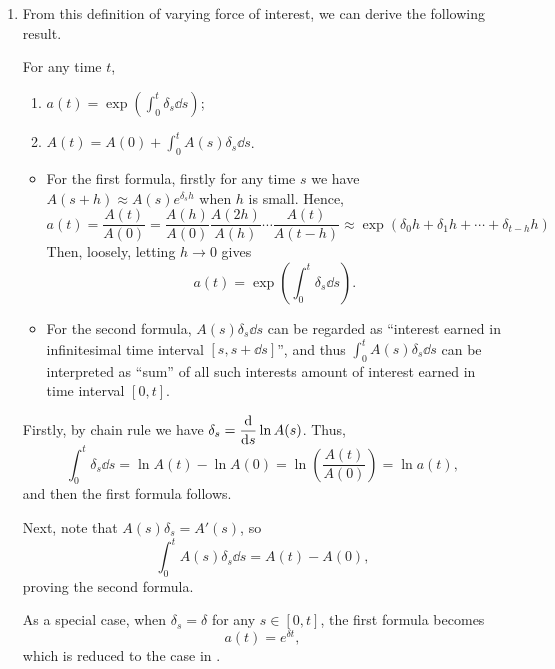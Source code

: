 \begin{enumerate}
\item From this definition of varying force of interest, we can derive the
following result.
\begin{proposition}
\label{prp:foi-fmlas}
For any time \(t\),
\begin{enumerate}
\item \(\displaystyle a(t)=\exp(\int_{0}^{t}\delta_s\dd{s})\);
\item \(\displaystyle A(t)=A(0)+\int_{0}^{t}A(s)\delta_s\dd{s}\).
\end{enumerate}
\end{proposition}
\begin{intuition}
\begin{itemize}
\item For the first formula, firstly for any time \(s\) we have \(A(s+h)\approx
A(s)e^{\delta_sh}\) when \(h\) is small. Hence,
\[
a(t)=\frac{A(t)}{A(0)}=\frac{A(h)}{A(0)}\frac{A(2h)}{A(h)}\dotsb\frac{A(t)}{A(t-h)}
\approx\exp(\delta_0h+\delta_1h+\dotsb+\delta_{t-h}h)
\]
Then, loosely, letting \(h\to 0\) gives
\[
a(t)=\exp(\int_{0}^{t}\delta_s\dd{s}).
\]
\item For the second formula, \(A(s)\delta_s\dd{s}\) can be regarded as
``interest earned in infinitesimal time interval \([s,s+\dd{s}]\)'', and thus
\(\displaystyle \int_{0}^{t}A(s)\delta_s\dd{s}\) can be interpreted as ``sum''
of all such interests  amount of interest earned in time
interval \([0,t]\).
\end{itemize}
\end{intuition}

\begin{pf}
Firstly, by chain rule we have \(\displaystyle \delta_s=\dv{}{s}\ln A(s)\).
Thus,
\[
\int_{0}^{t}\delta_s\dd{s}=\ln A(t)-\ln A(0)=\ln(\frac{A(t)}{A(0)})=\ln a(t),
\]
and then the first formula follows.

Next, note that \(A(s)\delta_s=A'(s)\), so
\[
\int_{0}^{t}A(s)\delta_s\dd{s}=A(t)-A(0),
\]
proving the second formula.
\end{pf}

\begin{note}
As a special case, when \(\delta_s=\delta\) for any \(s\in[0,t]\), the first
formula becomes
\[
a(t)=e^{\delta t},
\]
which is reduced to the case in .
\end{note}
\end{enumerate}
